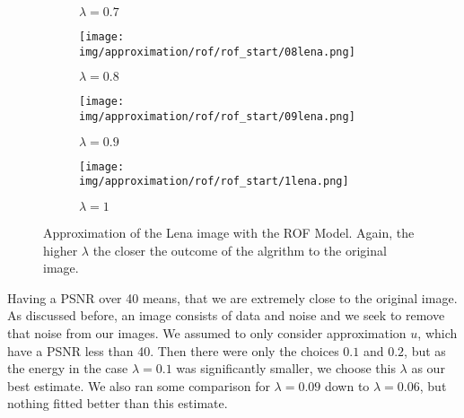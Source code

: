 \begin{figure}[ht]
\begin{subfigure}[b]{0.18\textwidth}
                \caption{$\lambda = 0.7$}
            \end{subfigure}
            \begin{subfigure}[b]{0.18\textwidth}
                \texttt{[image: img/approximation/rof/rof\_start/08lena.png]}
                \caption{$\lambda = 0.8$}
            \end{subfigure}
            \begin{subfigure}[b]{0.18\textwidth}
                \texttt{[image: img/approximation/rof/rof\_start/09lena.png]}
                \caption{$\lambda = 0.9$}
            \end{subfigure}
            \begin{subfigure}[b]{0.18\textwidth}
                \texttt{[image: img/approximation/rof/rof\_start/1lena.png]}
                \caption{$\lambda = 1$}
            \end{subfigure}
            \caption{Approximation of the Lena image with the ROF Model. Again, the higher $\lambda$ the closer the outcome of the algrithm to the original image.}
        \label{fig:rof_lena_second_compare}
        \end{figure}

        Having a PSNR over 40 means, that we are extremely close to the original image. As discussed before, an image consists of data and noise and we seek to remove that noise from our images. We assumed to only consider approximation $u$, which have a PSNR less than 40. Then there were only the choices $0.1$ and $0.2$, but as the energy in the case $\lambda = 0.1$ was significantly smaller, we choose this $\lambda$ as our best estimate. We also ran some comparison for $\lambda = 0.09$ down to $\lambda = 0.06$, but nothing fitted better than this estimate.

